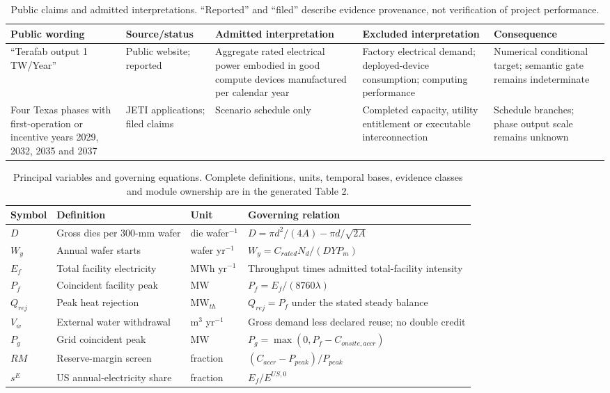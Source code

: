 
\begin{table}[htbp]
\centering
\caption{Public claims and admitted interpretations. “Reported” and “filed”
describe evidence provenance, not verification of project performance.}
\label{tab:claims}
\small
\begin{tabularx}{\textwidth}{p{}p{}p{}X X}
\toprule
Public wording & Source/status & Admitted interpretation & Excluded interpretation & Consequence \\
\midrule
``Terafab output 1 TW/Year'' & Public website; reported & Aggregate rated electrical power embodied in good compute devices manufactured per calendar year & Factory electrical demand; deployed-device consumption; computing performance & Numerical conditional target; semantic gate remains indeterminate \\
Four Texas phases with first-operation or incentive years 2029, 2032, 2035 and 2037 & JETI applications; filed claims & Scenario schedule only & Completed capacity, utility entitlement or executable interconnection & Schedule branches; phase output scale remains unknown \\
\bottomrule
\end{tabularx}
\end{table}

\begin{table}[htbp]
\centering
\caption{Principal variables and governing equations. Complete definitions,
units, temporal bases, evidence classes and module ownership are in the generated
Table 2.}
\label{tab:equations}
\small
\begin{tabularx}{\textwidth}{p{}p{}p{}X}
\toprule
Symbol & Definition & Unit & Governing relation \\
\midrule
$D$ & Gross dies per 300-mm wafer & die wafer$^{-1}$ & $D=\pi d^2/(4A)-\pi d/\sqrt{2A}$ \\
$W_y$ & Annual wafer starts & wafer yr$^{-1}$ & $W_y=C_{rated}N_d/(DYP_m)$ \\
$E_f$ & Total facility electricity & MWh yr$^{-1}$ & Throughput times admitted total-facility intensity \\
$P_f$ & Coincident facility peak & MW & $P_f=E_f/(8760\lambda)$ \\
$Q_{rej}$ & Peak heat rejection & MW$_{th}$ & $Q_{rej}=P_f$ under the stated steady balance \\
$V_w$ & External water withdrawal & m$^3$ yr$^{-1}$ & Gross demand less declared reuse; no double credit \\
$P_g$ & Grid coincident peak & MW & $P_g=\max(0,P_f-C_{onsite,accr})$ \\
$RM$ & Reserve-margin screen & fraction & $(C_{accr}-P_{peak})/P_{peak}$ \\
$s^E$ & US annual-electricity share & fraction & $E_f/E^{US,0}$ \\
\bottomrule
\end{tabularx}
\end{table}

